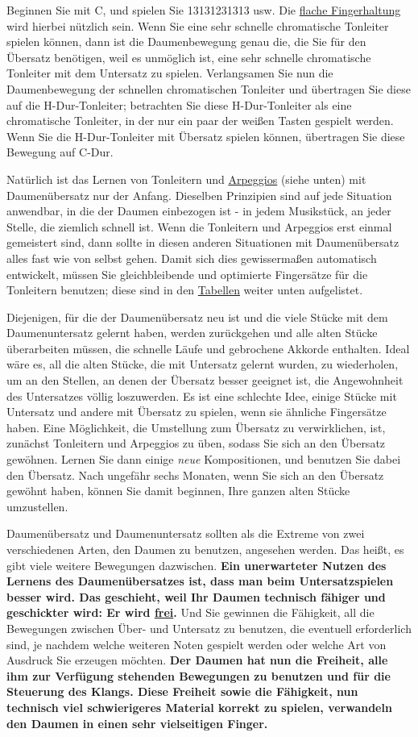 Beginnen Sie mit C, und spielen Sie 13131231313 usw.
Die \hyperref[c1iii4b]{flache Fingerhaltung} wird hierbei nützlich sein.
Wenn Sie eine sehr schnelle chromatische Tonleiter spielen können, dann ist die Daumenbewegung genau die, die Sie für den Übersatz benötigen, weil es unmöglich ist, eine sehr schnelle chromatische Tonleiter mit dem Untersatz zu spielen.
Verlangsamen Sie nun die Daumenbewegung der schnellen chromatischen Tonleiter und übertragen Sie diese auf die H-Dur-Tonleiter; betrachten Sie diese H-Dur-Tonleiter als eine chromatische Tonleiter, in der nur ein paar der weißen Tasten gespielt werden.
Wenn Sie die H-Dur-Tonleiter mit Übersatz spielen können, übertragen Sie diese Bewegung auf C-Dur.

Natürlich ist das Lernen von Tonleitern und \hyperref[Arpeggios]{Arpeggios} (siehe unten) mit Daumenübersatz nur der Anfang.
Dieselben Prinzipien sind auf jede Situation anwendbar, in die der Daumen einbezogen ist - in jedem Musikstück, an jeder Stelle, die ziemlich schnell ist.
Wenn die Tonleitern und Arpeggios erst einmal gemeistert sind, dann sollte in diesen anderen Situationen mit Daumenübersatz alles fast wie von selbst gehen.
Damit sich dies gewissermaßen automatisch entwickelt, müssen Sie gleichbleibende und optimierte Fingersätze für die Tonleitern benutzen; diese sind in den \hyperref[table]{Tabellen} weiter unten aufgelistet.

Diejenigen, für die der Daumenübersatz neu ist und die viele Stücke mit dem Daumenuntersatz gelernt haben, werden zurückgehen und alle alten Stücke überarbeiten müssen, die schnelle Läufe und gebrochene Akkorde enthalten.
Ideal wäre es, all die alten Stücke, die mit Untersatz gelernt wurden, zu wiederholen, um an den Stellen, an denen der Übersatz besser geeignet ist, die Angewohnheit des Untersatzes völlig loszuwerden.
Es ist eine schlechte Idee, einige Stücke mit Untersatz und andere mit Übersatz zu spielen, wenn sie ähnliche Fingersätze haben.
Eine Möglichkeit, die Umstellung zum Übersatz zu verwirklichen, ist, zunächst Tonleitern und Arpeggios zu üben, sodass Sie sich an den Übersatz gewöhnen.
Lernen Sie dann einige \textit{neue} Kompositionen, und benutzen Sie dabei den Übersatz.
Nach ungefähr sechs Monaten, wenn Sie sich an den Übersatz gewöhnt haben, können Sie damit beginnen, Ihre ganzen alten Stücke umzustellen.

Daumenübersatz und Daumenuntersatz sollten als die Extreme von zwei verschiedenen Arten, den Daumen zu benutzen, angesehen werden.
Das heißt, es gibt viele weitere Bewegungen dazwischen.
\textbf{Ein unerwarteter Nutzen des Lernens des Daumenübersatzes ist, dass man beim Untersatzspielen besser wird.
Das geschieht, weil Ihr Daumen technisch fähiger und geschickter wird: Er wird \underline{frei}.}
Und Sie gewinnen die Fähigkeit, all die Bewegungen zwischen Über- und Untersatz zu benutzen, die eventuell erforderlich sind, je nachdem welche weiteren Noten gespielt werden oder welche Art von Ausdruck Sie erzeugen möchten.
\textbf{Der Daumen hat nun die Freiheit, alle ihm zur Verfügung stehenden Bewegungen zu benutzen und für die Steuerung des Klangs.
Diese Freiheit sowie die Fähigkeit, nun technisch viel schwierigeres Material korrekt zu spielen, verwandeln den Daumen in einen sehr vielseitigen Finger.}


